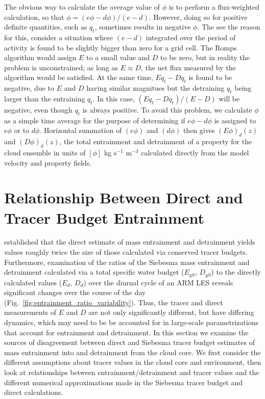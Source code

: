 \documentclass[12pt]{article}
\begin{document}
The obvious way to calculate the average value of $\phi$ is to perform a 
flux-weighted calculation, so that $\phi = (e\phi - d\phi)/(e - d)$.  However,
doing so for positive definite quantities, such as $q_t$, sometimes results in 
negative $\phi$.  The see the reason for this, consider a situation 
where $(e - d)$ integrated over the period of activity is found to be slightly 
bigger than zero for a grid cell.  The Romps algorithm would assign $E$ to a 
small value and $D$ to be zero, but in reality the problem is unconstrained; as 
long as $E \approx D$, the net flux measured by the algorithm would be 
satisfied.  At the same time, $E q_t - D q_t$ is found to be negative, due to 
$E$ and $D$ having similar magnitues but the detraining $q_t$ being larger 
than the entraining $q_t$.  In this case, $(E q_t - D q_t)/(E-D)$ will be 
negative, even though $q_t$ is always positive.  To avoid this problem, we 
calculate $\phi$ as a simple time average for the purpose of determining if 
$e\phi-d\phi$ is assigned to $e\phi$ or to $d\phi$.  Horizontal summation of 
$(e\phi)$ and $(d\phi)$ then gives $(E\phi)_d(z)$ and $(D\phi)_d(z)$, the total 
entrainment and detrainment of a property for the cloud ensemble in units of 
$[\phi]$ kg s$^{-1}$ m$^{-3}$ calculated directly from the model velocity and 
property fields.


\section{Relationship Between Direct and Tracer Budget Entrainment}

\cite{Romps2010} established that the direct estimate of mass entrainment and 
detrainment yields values roughly twice the size of those calculated via 
conserved tracer budgets.  Furthermore, examination of the ratios of the 
Siebesma mass entrainment and detrainment calculated via a total specific water 
budget ($E_{qS}$, $D_{qS}$) to the directly calculated values ($E_d$, $D_d$) 
over the diurnal cycle of an ARM LES reveals significant changes over the 
course of the day (Fig.~\ref{fig:entrainment_ratio_variability}).  Thus, the 
tracer and direct measurements of $E$ and $D$ are not only significantly
different, but have differing dynamics, which may need to be be accounted for
in large-scale parametrizations that account for entrainment and
detrainment.  In this section we examine the sources of disagreement
between direct and Siebesma tracer budget estimates of mass
entrainment into and detrainment from the cloud core. We first
consider the different assumptions about tracer values in the cloud
core and environment, then look at relationships between
entrainment/detrainment and tracer values and the different numerical
approximations made in the Siebesma tracer budget and direct calculations.
\end{document}
